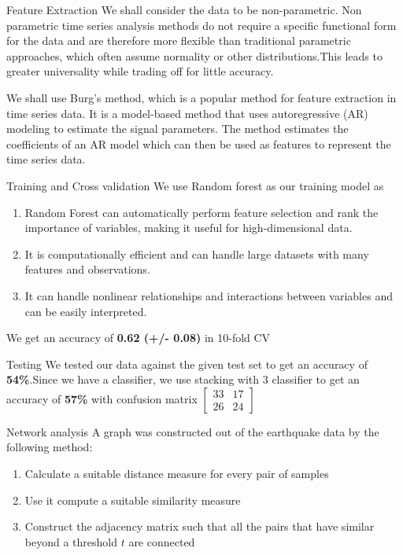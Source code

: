 \begin{frame}{Feature Extraction}
    We shall consider the data to be non-parametric. Non parametric time series analysis methods do not require a specific functional form for the data and are therefore more flexible than traditional parametric approaches, which often assume normality or other distributions.This leads to greater universality while trading off for little accuracy.\pause

    We shall use Burg's method, which is a popular method for feature extraction in time series data. It is a model-based method that uses autoregressive (AR) modeling to estimate the signal parameters. The method estimates the coefficients of an AR model which can then be used as features to represent the time series data.
\end{frame}

\begin{frame}{Training and Cross validation}
We use Random forest as our training model as
\begin{enumerate}[$\bullet$]
    \item Random Forest can automatically perform feature selection and rank the importance of variables, making it useful for high-dimensional data.\pause
    \item  It is computationally efficient and can handle large datasets with many features and observations.\pause
    \item It can handle nonlinear relationships and interactions between variables and can be easily interpreted.\pause
\end{enumerate}
We get an accuracy of \textbf{0.62 (+/- 0.08)} in 10-fold CV
\end{frame}

\begin{frame}{Testing}
    We tested our data against the given test set to get an accuracy of \textbf{54\%}.\pause Since we have a classifier, we use stacking with 3 classifier to get an accuracy of \textbf{57\%} with confusion matrix \textbf{$\begin{bmatrix}
33&17\\
26&24
\end{bmatrix}$}
\end{frame}


\begin{frame}{Network analysis}
    A graph was constructed out of the earthquake data by the following method:
\begin{enumerate}[$\bullet$]
    \item Calculate a suitable distance measure for every pair of samples\pause
    \item Use it compute a suitable similarity measure\pause
    \item Construct the adjacency matrix such that all the pairs that have similar beyond a threshold $t$ are connected
\end{enumerate}
\end{frame}


